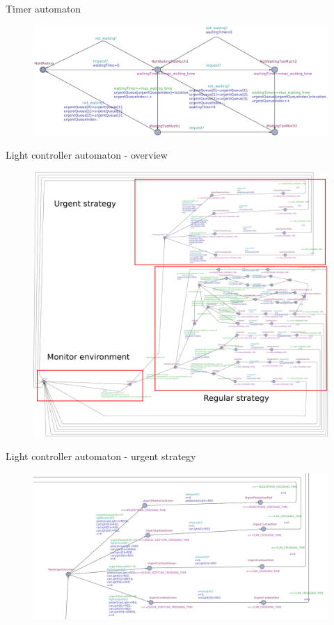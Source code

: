 \documentclass{bredelebeamer}
\begin{document}
\begin{frame}{Timer automaton}
\begin{figure}[h]
\centering
\includegraphics[width=\textwidth]{images/Timer.pdf}
\end{figure}
\end{frame}

\begin{frame}{Light controller automaton - overview}
\begin{figure}[h]
\centering
\includegraphics[scale=0.1]{images/light_controller_overview.png}
\end{figure}
\end{frame}

\begin{frame}{Light controller automaton - urgent strategy}
\begin{figure}[h]
\centering
\includegraphics[width=\textwidth]{images/light_controller_urgent_strategy.png}
\end{figure}
\end{frame}
\end{document}
